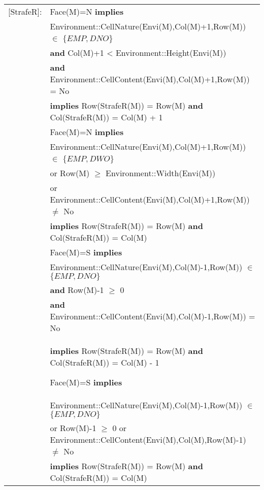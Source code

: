 \begin{tabular}{rl}
[StrafeR]: & 
Face(M)=N \textbf{implies} \\&
\quad
Environment::CellNature(Envi(M),Col(M)+1,Row(M)) $\in$ $\{EMP, DNO\}$\\&
\quad \textbf{and} Col(M)+1 < Environment::Height(Envi(M))
\\& \quad
\textbf{and} Environment::CellContent(Envi(M),Col(M)+1,Row(M)) = No
\\& \quad
\textbf{implies} Row(StrafeR(M)) = Row(M) \textbf{and} Col(StrafeR(M)) = Col(M) + 1\\
&
Face(M)=N \textbf{implies}\\&
\quad
Environment::CellNature(Envi(M),Col(M)+1,Row(M)) $\in$ $\{EMP, DWO\}$\\&
\quad
or Row(M) $\geq$ Environment::Width(Envi(M))
\\&
\quad
or Environment::CellContent(Envi(M),Col(M)+1,Row(M)) $\neq$ No
\\&
\quad\quad
\textbf{implies} Row(StrafeR(M)) = Row(M)
\textbf{and} Col(StrafeR(M)) = Col(M)\\
&
Face(M)=S \textbf{implies}\\&
\quad Environment::CellNature(Envi(M),Col(M)-1,Row(M)) $\in$ $\{EMP, DNO\}$ \\&
\quad
\textbf{and} Row(M)-1 $\geq$ 0
\\&
\quad
\textbf{and} Environment::CellContent(Envi(M),Col(M)-1,Row(M)) = No
\\&
\quad\quad
\textbf{implies} Row(StrafeR(M)) = Row(M)
\textbf{and} Col(StrafeR(M)) = Col(M) - 1

Face(M)=S \textbf{implies}\\&
\quad
Environment::CellNature(Envi(M),Col(M)-1,Row(M)) $\in$
$\{EMP, DNO\}$\\&
\quad
or Row(M)-1 $\geq$ 0
or Environment::CellContent(Envi(M),Col(M),Row(M)-1) $\neq$ No\\&
\quad\quad
\textbf{implies} Row(StrafeR(M)) = Row(M)
\textbf{and} Col(StrafeR(M)) = Col(M)\\

\end{tabular}
